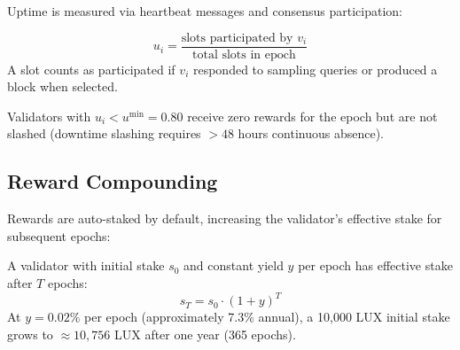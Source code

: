 Uptime is measured via heartbeat messages and consensus participation:

\begin{definition}
\begin{equation}
    u_i = \frac{\text{slots participated by } v_i}{\text{total slots in epoch}}
\end{equation}
A slot counts as participated if $v_i$ responded to sampling queries or produced a block when selected.
\end{definition}

Validators with $u_i < u^{\min} = 0.80$ receive zero rewards for the epoch but are not slashed (downtime slashing requires $> 48$ hours continuous absence).

\subsection{Reward Compounding}

Rewards are auto-staked by default, increasing the validator's effective stake for subsequent epochs:

\begin{proposition}
A validator with initial stake $s_0$ and constant yield $y$ per epoch has effective stake after $T$ epochs:
\begin{equation}
    s_T = s_0 \cdot (1 + y)^T
\end{equation}
At $y = 0.02\%$ per epoch (approximately 7.3\% annual), a 10{,}000 LUX initial stake grows to $\approx 10{,}756$ LUX after one year (365 epochs).
\end{proposition}

